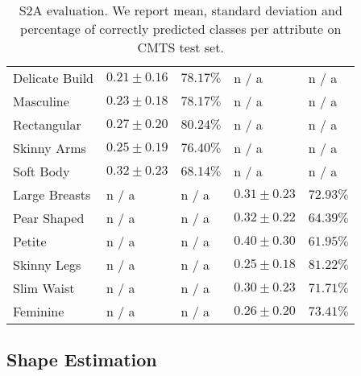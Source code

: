 \documentclass[10pt,twocolumn,letterpaper]{article}
\newcommand{\cmts}{CMTS\xspace}
\newcommand{\vspaceTABaboveCaption}{-0.0 em}
\newcommand{\na}{n / a}
\begin{document}
\begin{appendices}
\begin{table}[t!]
{\begin{tabular}{lllll}
            Delicate Build             & $0.21 \pm 0.16$           & $78.17\%$                  & \na             & \na       \\
            Masculine                  & $0.23 \pm 0.18$           & $78.17\%$                  & \na             & \na       \\
            Rectangular                & $0.27 \pm 0.20$           & $80.24\%$                  & \na             & \na       \\
            Skinny Arms                & $0.25 \pm 0.19$           & $76.40\%$                  & \na             & \na       \\
            Soft Body                  & $0.32 \pm 0.23$           & $68.14\%$                  & \na             & \na       \\
            Large Breasts              & \na                       & \na                        & $0.31 \pm 0.23$ & $72.93\%$ \\
            Pear Shaped                & \na                       & \na                        & $0.32 \pm 0.22$ & $64.39\%$ \\
            Petite                     & \na                       & \na                        & $0.40 \pm 0.30$ & $61.95\%$ \\
            Skinny Legs                & \na                       & \na                        & $0.25 \pm 0.18$ & $81.22\%$ \\
            Slim Waist                 & \na                       & \na                        & $0.30 \pm 0.23$ & $71.71\%$ \\
            Feminine                   & \na                       & \na                        & $0.26 \pm 0.20$ & $73.41\%$ \\
            \bottomrule
        \end{tabular}
    }
    \vspace{\vspaceTABaboveCaption}
    \caption{S2A evaluation. We report mean, standard deviation and percentage of correctly predicted classes per attribute on \cmts test set.
    }
    \label{tab:s2a_quant_result}
\end{table}
 
\subsection{Shape Estimation}


\end{appendices}
\end{document}
